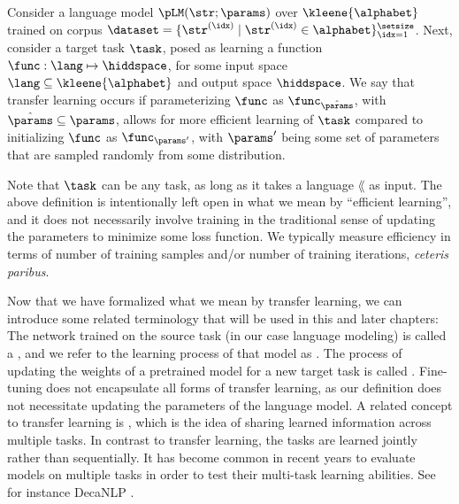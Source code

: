 \begin{definition}
Consider a language model $\pLM(\str; \params)$ over $\kleene{\alphabet}$ trained on corpus $\dataset = \{ \str^{(\idx)} \mid \str^{(\idx)} \in \alphabet \}_{\idx=1}^{\setsize}$. Next, consider a target task $\task$, posed as learning a function $\func: \lang \mapsto \hiddspace$, for some input space $\lang\subseteq\kleene{\alphabet}$ and output space $\hiddspace$. We say that transfer learning occurs if 
parameterizing $\func$ as $\func_{\hat{\params}}$, with $\hat{\params} \subseteq \params$, 
allows for more efficient learning of $\task$ compared to initializing $\func$ as $\func_{\params'}$, with $\params'$ being some set of parameters that are sampled randomly from some distribution.

\end{definition}

Note that $\task$ can be any task, as long as it takes a language $\lang$ as input. The above definition is intentionally left open in what we mean by ``efficient learning'', and it does not necessarily involve training in the traditional sense of updating the parameters to minimize some loss function. We typically measure efficiency in terms of number of training samples and/or number of training iterations, \emph{ceteris paribus}. 

Now that we have formalized what we mean by transfer learning, we can introduce some related terminology that will be used in this and later chapters: The network trained on the source task (in our case language modeling) is called a ,  and we refer to the learning process of that model as . The process of updating the weights of a pretrained model for a new target task is called .
Fine-tuning does not encapsulate all forms of transfer learning, as our definition does not necessitate updating the parameters of the language model.
 
A related concept to transfer learning is , which is the idea of sharing learned information across multiple tasks. In contrast to transfer learning, the tasks are learned jointly rather than sequentially.
It has become common in recent years to evaluate models on multiple tasks in order to test their multi-task learning abilities. See for instance DecaNLP \citep{McCann2018decaNLP}. %

